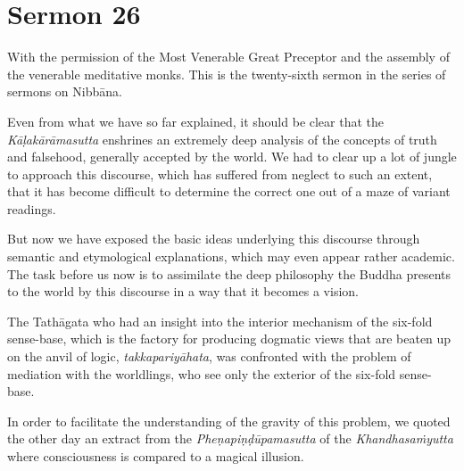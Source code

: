 \chapter{Sermon 26}

\NibbanaOpeningQuote

With the permission of the Most Venerable Great Preceptor and the assembly of the venerable meditative monks. This is the twenty-sixth sermon in the series of sermons on Nibbāna.

Even from what we have so far explained, it should be clear that the \emph{Kāḷakārāmasutta} enshrines an extremely deep analysis of the concepts of truth and falsehood, generally accepted by the world. We had to clear up a lot of jungle to approach this discourse, which has suffered from neglect to such an extent, that it has become difficult to determine the correct one out of a maze of variant readings.

But now we have exposed the basic ideas underlying this discourse through semantic and etymological explanations, which may even appear rather academic. The task before us now is to assimilate the deep philosophy the Buddha presents to the world by this discourse in a way that it becomes a vision.

The Tathāgata who had an insight into the interior mechanism of the six-fold sense-base, which is the factory for producing dogmatic views that are beaten up on the anvil of logic, \emph{takkapariyāhata}, was confronted with the problem of mediation with the worldlings, who see only the exterior of the six-fold sense-base.

In order to facilitate the understanding of the gravity of this problem, we quoted the other day an extract from the \emph{Pheṇapiṇḍūpamasutta} of the \emph{Khandhasaṁyutta} where consciousness is compared to a magical illusion.


